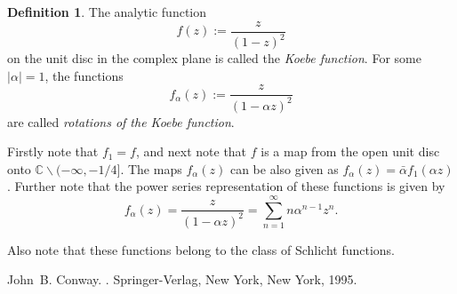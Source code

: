 \documentclass[12pt]{article}
\theoremstyle{theorem}
\theoremstyle{definition}
\newtheorem*{defn}{Definition}
\begin{document}
\begin{defn}
The analytic function
\begin{equation*}
f(z) := \frac{z}{(1-z)^2}
\end{equation*}
on the unit disc in the complex plane is called the {\em Koebe function}.  For some $\lvert \alpha \rvert = 1$, the functions
\begin{equation*}
f_\alpha(z) := \frac{z}{(1- \alpha z)^2}
\end{equation*}
are called {\em rotations of the Koebe function}.
\end{defn}

Firstly note that $f_1 = f$, and
next
note that $f$ is a map from the open unit disc onto ${\mathbb{C}} \backslash (-\infty,-1/4]$.  The maps $f_\alpha (z)$ can be also given as
$f_\alpha(z) = \bar{\alpha} f_1 (\alpha z )$.
Further note that the power series representation of these
functions is given by
\begin{equation*}
f_\alpha(z) = \frac{z}{(1-\alpha z)^2}
= \sum_{n=1}^\infty n \alpha^{n-1} z^n .
\end{equation*}

Also note that these functions belong to the class of Schlicht functions.

\begin{thebibliography}{9}
John~B. Conway.
{\em {}}.
Springer-Verlag, New York, New York, 1995.
\end{thebibliography}
\end{document}
